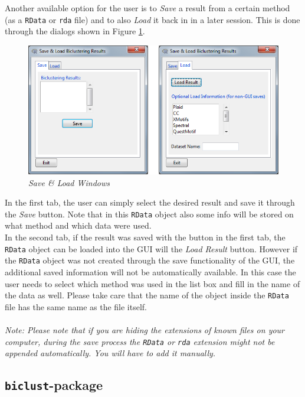 \documentclass[a4paper]{article}\usepackage[]{graphicx}\usepackage[]{color}
\begin{document}
\noindent Another available option for the user is to {\it Save} a result from a
certain method (as a \verb|RData| or \verb|rda| file) and to also {\it Load} it
back in in a later session.
This is done through the dialogs shown in Figure \ref{saveloadwindow}.
\begin{figure}[H]
\centering
\includegraphics[scale=0.4]{figures/saveloadwindow.png}
\caption{{\it Save \& Load Windows}\label{saveloadwindow}}
\end{figure}
\noindent In the first tab, the user can simply select the desired result and
save it through the {\it Save} button. Note that in this \verb|RData| object also some
info will be stored on what method and which data were used.\\
In the second tab, if the result was saved with the button in the first tab, the
\verb|RData| object can be loaded into the GUI will the {\it Load Result}
button. However if the \verb|RData| object was not created through the save
functionality of the GUI, the additional saved information will not be
automatically available. In this case the user needs to select which method was
used in the list box and fill in the name of the data as well. Please take care
that the name of the object inside the \verb|RData| file has the same name as
the file itself.
\\ \\
{\it Note: Please note that if you are hiding the extensions of known files on your computer, during the save process the \verb|RData| or \verb|rda| extension might not be appended automatically.
You will have to add it manually.}

\subsection{\texttt{biclust}-package}
\end{document}
